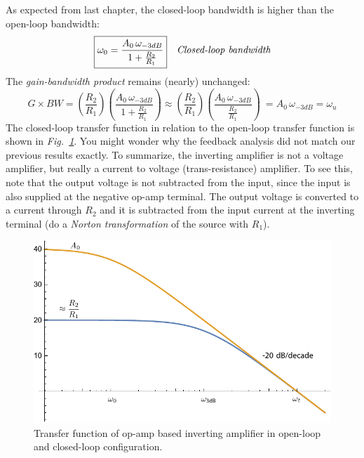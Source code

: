 As expected from last chapter, the closed-loop bandwidth is higher than the open-loop bandwidth:
    \begin{align}
        \Aboxed{\omega_0 &= \frac{A_0\,\omega_{-3dB}}{1 + \frac{R_2}{R_1}}}
        &\textit{Closed-loop bandwidth}
    \end{align}
The \textit{gain-bandwidth product} remains (nearly) unchanged:
    \begin{equation} 
        G \times BW = \left(\frac{R_2}{R_1}\right) \left(\frac{A_0\,\omega_{-3dB}}{1 + \frac{R_2}{R_1}}\right)
        \approx \left(\frac{R_2}{R_1}\right) \left(\frac{A_0\,\omega_{-3dB}}{\frac{R_2}{R_1}}\right)\
        = \boxed{A_0\,\omega_{-3dB} = \omega_u}
    \end{equation}
The closed-loop transfer function in relation to the open-loop transfer function is shown in \emph{Fig.~\ref{fig:mag1pole_fb_label}}.  You might wonder why the feedback analysis did not match our previous results exactly.  To summarize, the inverting amplifier is not a voltage amplifier, but really a current to voltage (trans-resistance) amplifier.  To see this, note that the output voltage is not subtracted from the input, since the input is also supplied at the negative op-amp terminal. The output voltage is converted to a current through $R_2$ and it is subtracted from the input current at the inverting terminal (do a \textit{Norton transformation} of the source with $R_1$).
\begin{figure}[H]
\centering
\includegraphics[scale=0.65]{mag1pole_fb_label}
\caption{Transfer function of op-amp based inverting amplifier in open-loop and closed-loop configuration.}
\label{fig:mag1pole_fb_label}
\end{figure}
